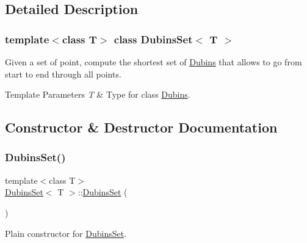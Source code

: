 \subsection{Detailed Description}
\subsubsection*{template$<$class T$>$\newline
class Dubins\+Set$<$ T $>$}

Given a set of point, compute the shortest set of \mbox{\hyperlink{class_dubins}{Dubins}} that allows to go from start to end through all points. 


\begin{DoxyTemplParams}{Template Parameters}
{\em T} & Type for class {\ttfamily \mbox{\hyperlink{class_dubins}{Dubins}}}. \\
\hline
\end{DoxyTemplParams}


\subsection{Constructor \& Destructor Documentation}
\mbox{\label{class_dubins_set_a86b2db7ab4ca20735b9fdeb0bf847d76}} 
\subsubsection{\texorpdfstring{DubinsSet()}{DubinsSet()}\hspace{0.1cm}{\footnotesize\ttfamily [1/5]}}
{\footnotesize\ttfamily template$<$class T$>$ \\
\mbox{\hyperlink{class_dubins_set}{Dubins\+Set}}$<$ T $>$\+::\mbox{\hyperlink{class_dubins_set}{Dubins\+Set}} (\begin{DoxyParamCaption}{ }\end{DoxyParamCaption})\hspace{0.3cm}{\ttfamily [inline]}}

Plain constructor for {\ttfamily \mbox{\hyperlink{class_dubins_set}{Dubins\+Set}}}. \mbox{\label{class_dubins_set_a36295af30ddae6a33bb6a8e35aee7eb1}} 
